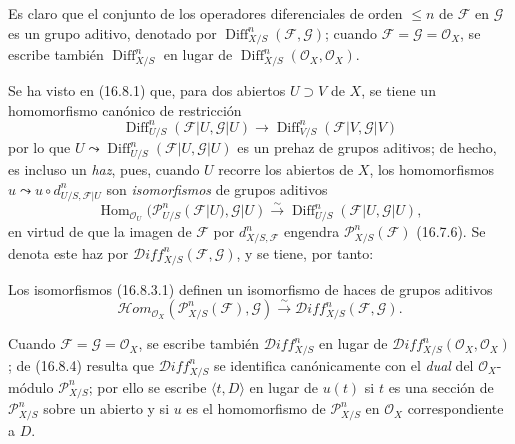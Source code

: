 \begin{env}[16.8.3]
\label{IV.16.8.3}
Es claro que el conjunto de los operadores diferenciales de orden $\leq n$ de
$\mathscr{F}$ en $\mathscr{G}$ es un grupo aditivo, denotado por
$\operatorname{Diff}_{X/S}^n(\mathscr{F},\mathscr{G})$; cuando
$\mathscr{F}=\mathscr{G}=\mathcal{O}_X$, se escribe también
$\operatorname{Diff}_{X/S}^n$ en lugar de
$\operatorname{Diff}_{X/S}^n(\mathcal{O}_X,\mathcal{O}_X)$.

Se ha visto en (16.8.1) que, para dos abiertos $U\supset V$ de $X$, se tiene
un homomorfismo canónico de restricción
\[
  \operatorname{Diff}_{U/S}^n(\mathscr{F}|U,\mathscr{G}|U)
  \longrightarrow
  \operatorname{Diff}_{V/S}^n(\mathscr{F}|V,\mathscr{G}|V)
\]
por lo que $U\leadsto\operatorname{Diff}_{U/S}^n(\mathscr{F}|U,\mathscr{G}|U)$
es un prehaz de grupos aditivos; de hecho, es incluso un \emph{haz}, pues,
cuando $U$ recorre los abiertos de $X$, los homomorfismos
$u\leadsto u\circ d_{U/S,\mathscr{F}|U}^n$ son \emph{isomorfismos} de grupos
aditivos
\[
  \operatorname{Hom}_{\mathcal{O}_U}
  (\mathscr{P}_{U/S}^n(\mathscr{F}|U),\mathscr{G}|U)
  \xrightarrow{\sim}
  \operatorname{Diff}_{U/S}^n(\mathscr{F}|U,\mathscr{G}|U),
  \tag{16.8.3.1}
  \label{IV.16.8.3.1}
\]
en virtud de que la imagen de $\mathscr{F}$ por
$d_{X/S,\mathscr{F}}^n$ engendra $\mathscr{P}_{X/S}^n(\mathscr{F})$
(16.7.6). Se denota este haz por
$\mathscr{D}\!iff_{X/S}^n(\mathscr{F},\mathscr{G})$, y se tiene, por tanto:
\end{env}

\begin{proposition}[16.8.4]
\label{IV.16.8.4}
Los isomorfismos \textup{(16.8.3.1)} definen un isomorfismo de haces de grupos
aditivos
\[
  \mathscr{H}\!om_{\mathcal{O}_X}
  (\mathscr{P}_{X/S}^n(\mathscr{F}),\mathscr{G})
  \xrightarrow{\sim}
  \mathscr{D}\!iff_{X/S}^n(\mathscr{F},\mathscr{G}).
  \tag{16.8.4.1}
  \label{IV.16.8.4.1}
\]
\end{proposition}

Cuando $\mathscr{F}=\mathscr{G}=\mathcal{O}_X$, se escribe también
$\mathscr{D}\!iff_{X/S}^n$ en lugar de
$\mathscr{D}\!iff_{X/S}^n(\mathcal{O}_X,\mathcal{O}_X)$; de (16.8.4) resulta
que $\mathscr{D}\!iff_{X/S}^n$ se identifica canónicamente con el
\emph{dual} del $\mathcal{O}_X$-módulo $\mathscr{P}_{X/S}^n$; por ello se
escribe $\langle t,D\rangle$ en lugar de $u(t)$ si $t$ es una sección de
$\mathscr{P}_{X/S}^n$ sobre un abierto y si $u$ es el homomorfismo de
$\mathscr{P}_{X/S}^n$ en $\mathcal{O}_X$ correspondiente a $D$.


